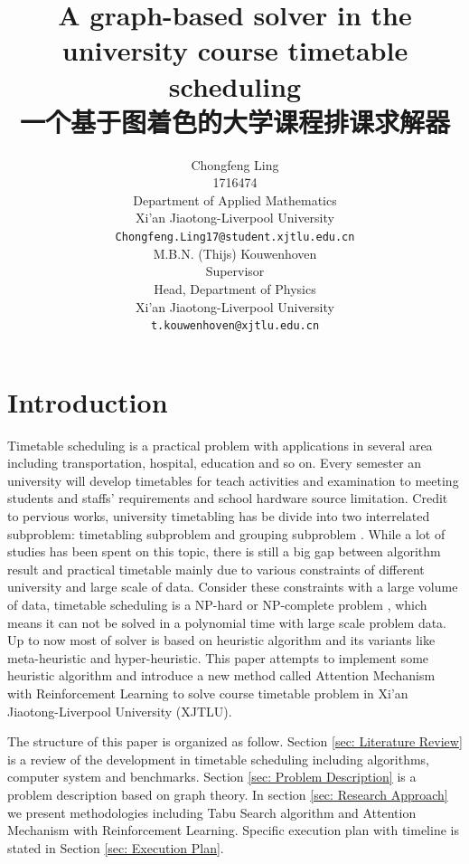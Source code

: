 \documentclass{article}
\title{A graph-based solver in the university course timetable scheduling\\
一个基于图着色的大学课程排课求解器}
\author{ \hspace{1mm}Chongfeng Ling \\
	1716474\\
	Department of Applied Mathematics\\
	Xi'an Jiaotong-Liverpool University\\
	\texttt{Chongfeng.Ling17@student.xjtlu.edu.cn} \\
	\And
	M.B.N. (Thijs) Kouwenhoven \\
	Supervisor \\
	Head, Department of Physics \\
	Xi'an Jiaotong-Liverpool University\\
	\texttt{t.kouwenhoven@xjtlu.edu.cn} \\
}
\begin{document}
\maketitle



\newpage
\tableofcontents
\newpage
\section{Introduction}

Timetable scheduling is a practical problem with applications in several area including transportation, hospital, education and so on. Every semester an university will develop timetables for teach activities and examination to meeting students and staffs' requirements and school hardware source limitation. Credit to pervious works, university timetabling has be divide into two interrelated subproblem: timetabling subproblem and grouping subproblem \citep{(werra1989)tabu}. While a lot of studies has been spent on this topic, there is still a big gap between algorithm result and practical timetable \citep{(mccollum2006)perspective} mainly due to various constraints of different university and large scale of data. Consider these constraints with a large volume of data, timetable scheduling is a NP-hard or NP-complete problem \citep{(even1975)complexity}, which means it can not be solved in a polynomial time with large scale problem data. Up to now most of solver is based on heuristic algorithm and its variants like meta-heuristic and hyper-heuristic. This paper attempts to implement some heuristic algorithm and introduce a new method called Attention Mechanism with Reinforcement Learning to solve course timetable problem in Xi'an Jiaotong-Liverpool University (XJTLU).

The structure of this paper is organized as follow. Section \ref{sec: Literature Review} is a review of the development in timetable scheduling including algorithms, computer system and benchmarks. Section \ref{sec: Problem Description} is a problem description based on graph theory. In section \ref{sec: Research Approach} we present methodologies  including Tabu Search algorithm and Attention Mechanism with Reinforcement Learning. Specific execution plan with timeline is stated in Section \ref{sec: Execution Plan}.
\end{document}
